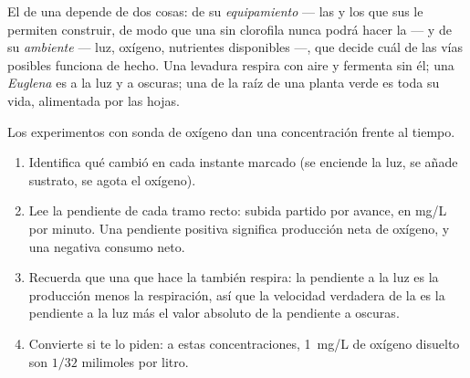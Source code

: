 \begin{proposition}\label{prop:g10:cell-metabolism:decides}
El  de una  depende de dos cosas: de su
\emph{equipamiento} --- las  y los  que sus  le
permiten construir, de modo que una  sin clorofila nunca podrá
hacer la  --- y de su \emph{ambiente} --- luz, oxígeno,
nutrientes disponibles ---, que decide cuál de las vías posibles
funciona de hecho. Una levadura respira con aire y fermenta sin él; una
\emph{Euglena} es  a la luz y  a oscuras; una
 de la raíz de una planta verde es  toda su vida,
alimentada por las hojas.
\end{proposition}
\admitted

\begin{method}\label{met:g10:cell-metabolism:trace}
Los experimentos con sonda de oxígeno dan una concentración frente al
tiempo.
\begin{enumerate}
  \item Identifica qué cambió en cada instante marcado (se enciende la
        luz, se añade sustrato, se agota el oxígeno).
  \item Lee la pendiente de cada tramo recto: subida partido por
        avance, en \unit{mg/L} por minuto. Una pendiente positiva
        significa producción neta de oxígeno, y una negativa consumo
        neto.
  \item Recuerda que una  que hace la  también
        respira: la pendiente a la luz es la producción menos la
        respiración, así que la velocidad verdadera de la 
        es la pendiente a la luz más el valor absoluto de la pendiente
        a oscuras.
  \item Convierte si te lo piden: a estas concentraciones,
        \qty{1}{mg/L} de oxígeno disuelto son $1/32$ milimoles por
        litro.
\end{enumerate}
\end{method}

